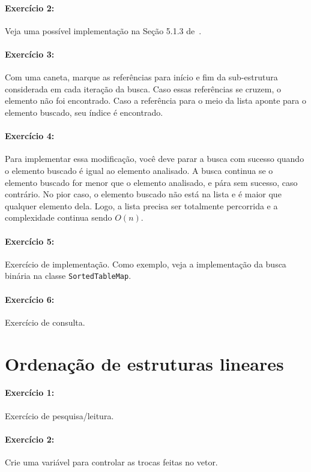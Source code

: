\paragraph{Exercício 2:}
Veja uma possível implementação na Seção 5.1.3 de~\cite{GoodrichEtAl2014}.

\paragraph{Exercício 3:}
Com uma caneta, marque as referências para início e fim da sub-estrutura considerada em cada iteração da busca. Caso essas referências se cruzem, o elemento não foi encontrado. Caso a referência para o meio da lista aponte para o elemento buscado, seu índice é encontrado.

\paragraph{Exercício 4:}
Para implementar essa modificação, você deve parar a busca com sucesso quando o elemento buscado é igual ao elemento analisado. A busca continua se o elemento buscado for menor que o elemento analisado, e pára sem sucesso, caso contrário. No pior caso, o elemento buscado não está na lista e é maior que qualquer elemento dela. Logo, a lista precisa ser totalmente percorrida e a complexidade continua sendo $O(n)$.

\paragraph{Exercício 5:}
Exercício de implementação. Como exemplo, veja a implementação da busca binária na classe \texttt{SortedTableMap}.

\paragraph{Exercício 6:}
Exercício de consulta.

\section{Ordenação de estruturas lineares}

\paragraph{Exercício 1:}
Exercício de pesquisa/leitura.

\paragraph{Exercício 2:}
Crie uma variável para controlar as trocas feitas no vetor.

